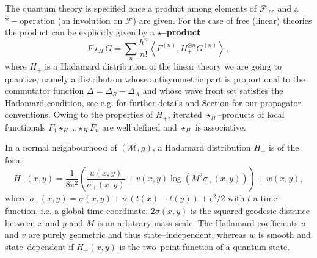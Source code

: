 \documentclass[10pt]{book}
\newcommand{\loc}{\mathsf{loc}}
\newcommand{\Mcal}{\mathcal{M}}
\theoremstyle{break}
\begin{document}
The quantum theory is specified once a product among elements of $\mathcal{F}_\loc$ and a $*-$operation (an involution on $\mathcal{F}$) are given. For the case of free (linear) theories the product can be explicitly given by a {\bf $\star$--product }
\begin{equation}
F \star_H  G =  \sum_n \frac{\hbar^n}{n!}\left\langle F^{(n)}, H_+^{\otimes n} G^{(n)} \right\rangle\,,
\end{equation}
where $H_+$ is a Hadamard distribution of the linear theory we are going to quantize, namely a distribution whose antisymmetric part is proportional to the commutator function $\Delta=\Delta_R-\Delta_A$ and whose wave front set satisfies the Hadamard condition, see e.g. %
for further details and Section %
for our propagator conventions. Owing to the properties of $H_+$, iterated $\star_H$--products of local functionals $F_1 \star_H \dots \star_H F_n$ are well defined and $\star_H$ is associative.

In a normal neighbourhood of $(\Mcal,g)$, a Hadamard distribution $H_+$ is of the form
\begin{equation}
H_+(x,y)=\frac{1}{8\pi^2}\left(\frac{u(x,y)}{\sigma_+(x,y)}+v(x,y)\log(M^2 \sigma_+(x,y))\right)+w(x,y),
\end{equation}
where $\sigma_+(x,y)=\sigma(x,y)+i\epsilon (t(x)-t(y))+\epsilon^2/2$ with $t$ a time-function, i.e. a global time-coordinate, $2\sigma(x,y)$ is the squared geodesic distance between $x$ and $y$ and $M$ is an arbitrary mass scale. The Hadamard coefficients $u$ and $v$ are purely geometric and thus state--independent, whereas $w$ is smooth and state--dependent if $H_+(x,y)$ is the two--point function of a quantum state.
\end{document}
